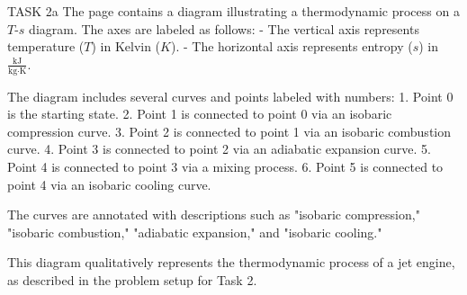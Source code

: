 TASK 2a  
The page contains a diagram illustrating a thermodynamic process on a \( T \)-\( s \) diagram. The axes are labeled as follows:  
- The vertical axis represents temperature (\( T \)) in Kelvin (\( K \)).  
- The horizontal axis represents entropy (\( s \)) in \( \frac{\text{kJ}}{\text{kg·K}} \).  

The diagram includes several curves and points labeled with numbers:  
1. Point 0 is the starting state.  
2. Point 1 is connected to point 0 via an isobaric compression curve.  
3. Point 2 is connected to point 1 via an isobaric combustion curve.  
4. Point 3 is connected to point 2 via an adiabatic expansion curve.  
5. Point 4 is connected to point 3 via a mixing process.  
6. Point 5 is connected to point 4 via an isobaric cooling curve.  

The curves are annotated with descriptions such as "isobaric compression," "isobaric combustion," "adiabatic expansion," and "isobaric cooling."  

This diagram qualitatively represents the thermodynamic process of a jet engine, as described in the problem setup for Task 2.